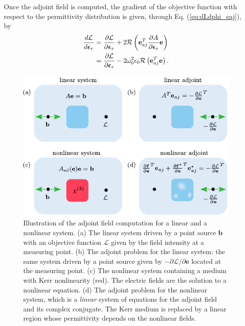 Once the adjoint field is computed, the gradient of the objective function with respect to the permittivity distribution is given, through Eq. (\ref{eq:dLdphi_eaj}), by 
%
\begin{align}
\frac{d\mathcal{L}}{d\bm{\epsilon}_r} &= \frac{\partial\mathcal{L}}{\partial \bm{\epsilon}_r} + 2\mathcal{R}\left(
\mathbf{e}_{aj}^T
\frac{\partial A} { \partial \bm{\epsilon}_r} \mathbf{e} \right) \\
 &= \frac{\partial\mathcal{L}}{\partial \bm{\epsilon}_r} - 2 \omega_0^2 \epsilon_0 \mathcal{R}\left(
\mathbf{e}_{aj}^T
 \mathbf{e} \right).
\label{eq:dLdphi_lin}
\end{align}
%

\begin{figure}[t]
\includegraphics[width=\columnwidth]{figures/angler_avm_illustration_2.pdf}
\caption{\label{fig:avm} Illustration of the adjoint field computation for a linear and a nonlinear system. (a) The linear system driven by a point source $\mathbf{b}$ with an objective function $\mathcal{L}$  given by the field intensity at a measuring point. (b)  The adjoint problem for the linear system: the same system driven by a point source given by $-\partial\mathcal{L}/\partial \mathbf{e}$ located at the measuring point.  (c) The nonlinear system containing a medium with Kerr nonlinearity (red).  The electric fields are the solution to a nonlinear equation. (d) The adjoint problem for the nonlinear system, which is a \textit{linear} system of equations for the adjoint field and its complex conjugate. The Kerr medium is replaced by a linear region whose permittivity depends on the nonlinear fields.}
\end{figure}

